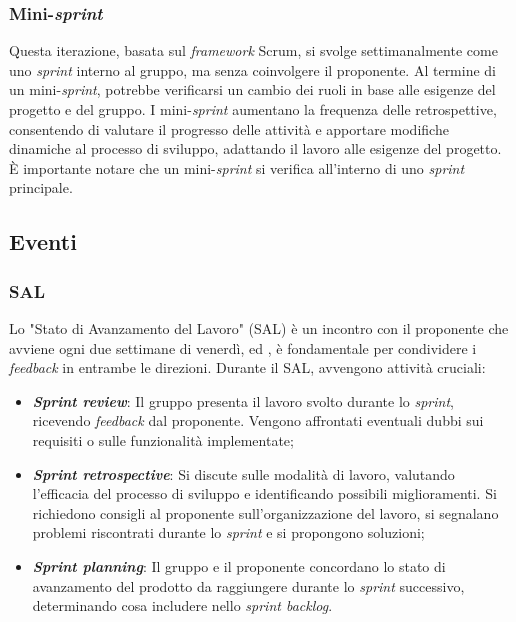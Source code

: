 \subsubsection{Mini-\textit{sprint}}
Questa iterazione, basata sul \textit{framework} Scrum, si svolge settimanalmente 
come uno \textit{sprint} interno al gruppo, ma senza coinvolgere il proponente. 
Al termine di un mini-\textit{sprint}, potrebbe verificarsi un cambio dei ruoli 
in base alle esigenze del progetto e del gruppo. 
I mini-\textit{sprint} aumentano la frequenza delle retrospettive, consentendo 
di valutare il progresso delle attività e apportare modifiche dinamiche al processo 
di sviluppo, adattando il lavoro alle esigenze del progetto. 
È importante notare che un mini-\textit{sprint} si verifica all'interno di uno 
\textit{sprint} principale.

\subsection{Eventi}

\subsubsection{SAL}
Lo "Stato di Avanzamento del Lavoro" (SAL) è un incontro con il proponente che
avviene ogni due settimane di venerdì, ed , è fondamentale per condividere i 
\textit{feedback} in entrambe le direzioni. 
Durante il SAL, avvengono attività cruciali:

\begin{itemize}
	\item \textbf{\textit{Sprint review}}: Il gruppo presenta il lavoro svolto 
			durante lo \textit{sprint}, ricevendo \textit{feedback} dal proponente. 
			Vengono affrontati eventuali dubbi sui requisiti o sulle funzionalità implementate;
	
	\item \textbf{\textit{Sprint retrospective}}: Si discute sulle modalità di lavoro, 
			valutando l'efficacia del processo di sviluppo e identificando possibili miglioramenti. 
			Si richiedono consigli al proponente sull'organizzazione del lavoro, si segnalano 
			problemi riscontrati durante lo \textit{sprint} e si propongono soluzioni;

	\item \textbf{\textit{Sprint planning}}: Il gruppo e il proponente concordano lo stato 
			di avanzamento del prodotto da raggiungere durante lo \textit{sprint} successivo, 
			determinando cosa includere nello \textit{sprint backlog}.
\end{itemize}

